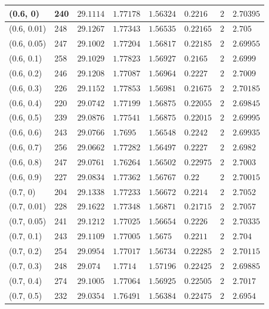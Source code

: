 \begin{center}
{\begin{longtable}{| l | p{} |  p{} | p{} | p{} | p{} | p{} | p{} |}
 (0.6, 0) & 240  & $29.1114$ & $1.77178$ & $1.56324$ & $0.2216$ & $2$ & $2.70395$ \\ \hline
 (0.6, 0.01) & 248  & $29.1267$ & $1.77343$ & $1.56535$ & $0.22165$ & $2$ & $2.705$ \\ \hline
 (0.6, 0.05) & 247  & $29.1002$ & $1.77204$ & $1.56817$ & $0.22185$ & $2$ & $2.69955$ \\ \hline
 (0.6, 0.1) & 258  & $29.1029$ & $1.77823$ & $1.56927$ & $0.2165$ & $2$ & $2.6999$ \\ \hline
 (0.6, 0.2) & 246  & $29.1208$ & $1.77087$ & $1.56964$ & $0.2227$ & $2$ & $2.7009$ \\ \hline
 (0.6, 0.3) & 226  & $29.1152$ & $1.77853$ & $1.56981$ & $0.21675$ & $2$ & $2.70185$ \\ \hline
 (0.6, 0.4) & 220  & $29.0742$ & $1.77199$ & $1.56875$ & $0.22055$ & $2$ & $2.69845$ \\ \hline
 (0.6, 0.5) & 239  & $29.0876$ & $1.77541$ & $1.56875$ & $0.22015$ & $2$ & $2.69995$ \\ \hline
 (0.6, 0.6) & 243  & $29.0766$ & $1.7695$ & $1.56548$ & $0.2242$ & $2$ & $2.69935$ \\ \hline
 (0.6, 0.7) & 256  & $29.0662$ & $1.77282$ & $1.56497$ & $0.2227$ & $2$ & $2.6982$ \\ \hline
 (0.6, 0.8) & 247  & $29.0761$ & $1.76264$ & $1.56502$ & $0.22975$ & $2$ & $2.7003$ \\ \hline
 (0.6, 0.9) & 227  & $29.0834$ & $1.77362$ & $1.56767$ & $0.22$ & $2$ & $2.70015$ \\ \hline
 (0.7, 0) & 204  & $29.1338$ & $1.77233$ & $1.56672$ & $0.2214$ & $2$ & $2.7052$ \\ \hline
 (0.7, 0.01) & 228  & $29.1622$ & $1.77348$ & $1.56871$ & $0.21715$ & $2$ & $2.7057$ \\ \hline
 (0.7, 0.05) & 241  & $29.1212$ & $1.77025$ & $1.56654$ & $0.2226$ & $2$ & $2.70335$ \\ \hline
 (0.7, 0.1) & 243  & $29.1109$ & $1.77005$ & $1.5675$ & $0.2211$ & $2$ & $2.704$ \\ \hline
 (0.7, 0.2) & 254  & $29.0954$ & $1.77017$ & $1.56734$ & $0.22285$ & $2$ & $2.70115$ \\ \hline
 (0.7, 0.3) & 248  & $29.074$ & $1.7714$ & $1.57196$ & $0.22425$ & $2$ & $2.69885$ \\ \hline
 (0.7, 0.4) & 274  & $29.1005$ & $1.77064$ & $1.56925$ & $0.22505$ & $2$ & $2.7017$ \\ \hline
 (0.7, 0.5) & 232  & $29.0354$ & $1.76491$ & $1.56384$ & $0.22475$ & $2$ & $2.6954$ \\ \hline

\end{longtable}}
\end{center}
